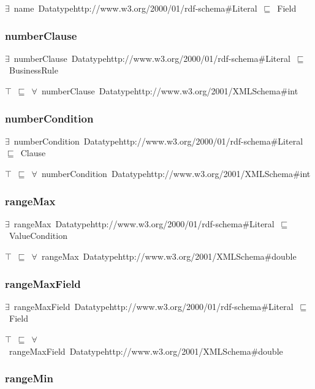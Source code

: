 \documentclass{article}
\begin{document}
\ensuremath{\exists}~name~Datatypehttp://www.w3.org/2000/01/rdf-schema#Literal~\ensuremath{\sqsubseteq}~Field

\subsubsection*{numberClause}

\ensuremath{\exists}~numberClause~Datatypehttp://www.w3.org/2000/01/rdf-schema#Literal~\ensuremath{\sqsubseteq}~BusinessRule

\ensuremath{\top}~\ensuremath{\sqsubseteq}~\ensuremath{\forall}~numberClause~Datatypehttp://www.w3.org/2001/XMLSchema#int

\subsubsection*{numberCondition}

\ensuremath{\exists}~numberCondition~Datatypehttp://www.w3.org/2000/01/rdf-schema#Literal~\ensuremath{\sqsubseteq}~Clause

\ensuremath{\top}~\ensuremath{\sqsubseteq}~\ensuremath{\forall}~numberCondition~Datatypehttp://www.w3.org/2001/XMLSchema#int

\subsubsection*{rangeMax}

\ensuremath{\exists}~rangeMax~Datatypehttp://www.w3.org/2000/01/rdf-schema#Literal~\ensuremath{\sqsubseteq}~ValueCondition

\ensuremath{\top}~\ensuremath{\sqsubseteq}~\ensuremath{\forall}~rangeMax~Datatypehttp://www.w3.org/2001/XMLSchema#double

\subsubsection*{rangeMaxField}

\ensuremath{\exists}~rangeMaxField~Datatypehttp://www.w3.org/2000/01/rdf-schema#Literal~\ensuremath{\sqsubseteq}~Field

\ensuremath{\top}~\ensuremath{\sqsubseteq}~\ensuremath{\forall}~rangeMaxField~Datatypehttp://www.w3.org/2001/XMLSchema#double

\subsubsection*{rangeMin}
\end{document}
